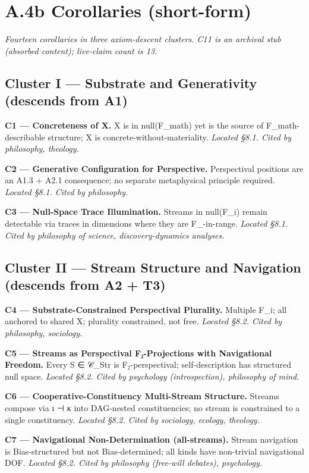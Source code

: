 \documentclass[11pt, openany]{book}
\begin{document}
\section{A.4b Corollaries (short-form)}

\textit{Fourteen corollaries in three axiom-descent clusters. C11 is an archival stub (absorbed content); live-claim count is 13.}

\subsection{Cluster I --- Substrate and Generativity (descends from A1)}

\textbf{C1 --- Concreteness of X.} X is in null(F\_\allowbreak{}math) yet is the source of F\_\allowbreak{}math-describable structure; X is concrete-without-materiality. \textit{Located §8.1. Cited by philosophy, theology.}

\textbf{C2 --- Generative Configuration for Perspective.} Perspectival positions are an A1.3 + A2.1 consequence; no separate metaphysical principle required. \textit{Located §8.1. Cited by philosophy.}

\textbf{C3 --- Null-Space Trace Illumination.} Streams in null(F\_\allowbreak{}i) remain detectable via traces in dimensions where they are F\_-in-range. \textit{Located §8.1. Cited by philosophy of science, discovery-dynamics analyses.}

\subsection{Cluster II --- Stream Structure and Navigation (descends from A2 + T3)}

\textbf{C4 --- Substrate-Constrained Perspectival Plurality.} Multiple F\_\allowbreak{}i; all anchored to shared X; plurality constrained, not free. \textit{Located §8.2. Cited by philosophy, sociology.}

\textbf{C5 --- Streams as Perspectival F₂-Projections with Navigational Freedom.} Every S ∈ 𝒞\_\allowbreak{}Str is F₂-perspectival; self-description has structured null space. \textit{Located §8.2. Cited by psychology (introspection), philosophy of mind.}

\textbf{C6 --- Cooperative-Constituency Multi-Stream Structure.} Streams compose via ι ⊣ κ into DAG-nested constituencies; no stream is constrained to a single constituency. \textit{Located §8.2. Cited by sociology, ecology, theology.}

\textbf{C7 --- Navigational Non-Determination (all-streams).} Stream navigation is Bias-structured but not Bias-determined; all kinds have non-trivial navigational DOF. \textit{Located §8.2. Cited by philosophy (free-will debates), psychology.}
\end{document}
